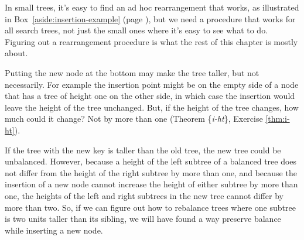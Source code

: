 In small trees, it's easy to find an ad hoc rearrangement that works, %
as illustrated in Box~\ref{aside:insertion-example}
(page \pageref{aside:insertion-example}),
but we need a procedure that works for all search trees,
not just the small ones where it's easy to see what to do. %
Figuring out a rearrangement procedure is what the rest
of this chapter is mostly about.

Putting the new node at the bottom may make the tree taller,
but not necessarily.
For example the insertion point might be on the
empty side of a node that has a tree of height one on the other side,
in which case the insertion would leave the height of the tree unchanged.
But, if the height of the tree changes,
how much could it change?
Not by more than one
(Theorem \{\emph{i-ht}\}, Exercise \ref{thm:i-ht}).

If the tree with the new key is taller than the old tree,
the new tree could be unbalanced.
However, because a height of the left subtree of a
balanced tree does not differ from the height of
the right subtree by more than one,
and because the insertion of a new node cannot increase
the height of either subtree by more than one,
the heights of the left and right subtrees in the new tree
cannot differ by more than two.
So, if we can figure out how to rebalance trees where
one subtree is two units taller than its sibling,
we will have found a way preserve balance
while inserting a new node.

